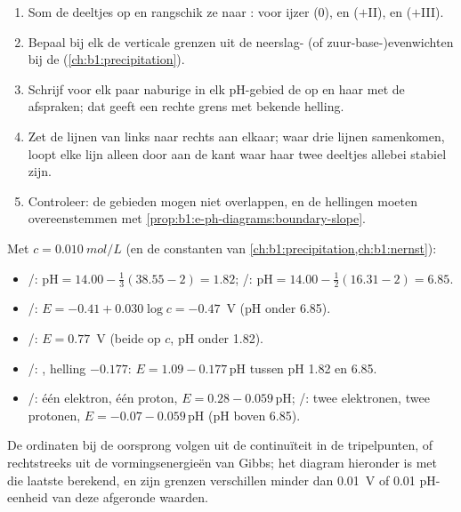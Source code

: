 \begin{method}\label{met:b1:e-ph-diagrams:build}
\begin{enumerate}
  \item Som de deeltjes op en rangschik ze naar : voor
        ijzer  (0),  en  ($+$II), 
        en  ($+$III).
  \item Bepaal bij elk  de verticale grenzen uit de neerslag-
        (of zuur-base-)evenwichten bij de 
        (\cref{ch:b1:precipitation}).
  \item Schrijf voor elk paar naburige  in elk pH-gebied
        de  op en haar  met de
        afspraken; dat geeft een rechte grens met bekende helling.
  \item Zet de lijnen van links naar rechts aan elkaar; waar drie lijnen
        samenkomen, loopt elke lijn alleen door aan de kant waar haar twee
        deeltjes allebei stabiel zijn.
  \item Controleer: de gebieden mogen niet overlappen, en de hellingen
        moeten overeenstemmen met \cref{prop:b1:e-ph-diagrams:boundary-slope}.
\end{enumerate}
\end{method}

\begin{example}\label{ex:b1:e-ph-diagrams:iron}
Met $c = \qty{0.010}{mol/L}$ (en de constanten van \cref{ch:b1:precipitation,ch:b1:nernst}):
\begin{itemize}
  \item {}/: $\mathrm{pH} = 14.00 - \frac13(38.55 - 2) = 1.82$;
        /: $\mathrm{pH} = 14.00 - \frac12(16.31 - 2) = 6.85$.
  \item {}/: $E = -0.41 + 0.030\log c = -0.47$~V (pH onder
        6.85).
  \item {}/: $E = 0.77$~V (beide op $c$, pH onder 1.82).
  \item {}/: ,
        helling
        $-0.177$: $E = 1.09 - 0.177\,\mathrm{pH}$ tussen pH 1.82 en 6.85.
  \item {}/: één elektron, één proton, $E = 0.28 -
        0.059\,\mathrm{pH}$; /: twee elektronen, twee
        protonen, $E = -0.07 - 0.059\,\mathrm{pH}$ (pH boven 6.85).
\end{itemize}
De ordinaten bij de oorsprong volgen uit de continuïteit in de
tripelpunten, of rechtstreeks uit de vormingsenergieën van Gibbs; het
diagram hieronder is met die laatste berekend, en zijn grenzen
verschillen minder dan \qty{0.01}{V} of 0.01 pH-eenheid van deze
afgeronde waarden.
\end{example}

